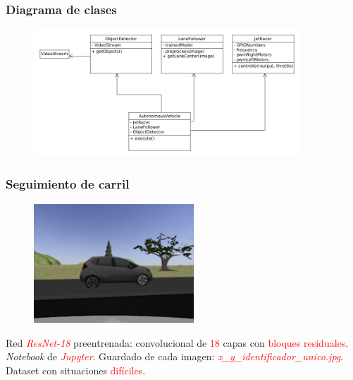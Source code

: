 \documentclass{beamer}
\begin{document}
\begin{frame}
	\frametitle{Diagrama de clases}
	\begin{figure}
		\centering
		\includegraphics[width=10cm]{figs/diagram6}
	\end{figure}
\end{frame}

\begin{frame}
	\frametitle{Seguimiento de carril}
	\begin{figure}
		\centering
		\includegraphics[width=6cm]{figs/trainedDifficult}
	\end{figure}
	\begin{outline}
		\1 Red \textcolor{red}{\textit{ResNet-18}} preentrenada: convolucional de \textcolor{red}{18} capas con \textcolor{red}{bloques residuales}.
		\1 \textit{Notebook} de \textcolor{red}{\textit{Jupyter}}.
		\1 Guardado de cada imagen: \textcolor{red}{\textit{x\_y\_identificador\_unico.jpg}}.
		\1 Dataset con situaciones \textcolor{red}{difíciles}.
	\end{outline}
\end{frame}
\end{document}
